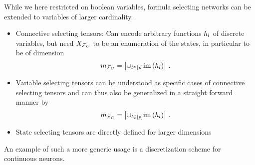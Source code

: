
While we here restricted on boolean variables, formula selecting networks can be extended to variables of larger cardinality.
\begin{itemize}
    \item Connective selecting tensors: Can encode arbitrary functions $h_{l}$ of discrete variables, but need $X_{\mathcal{F}_{C}}$ to be an enumeration of the states, in particular to be of dimension
    \[ m_{\mathcal{F}_{C}} = \left| \cup_{l\in[p]} \mathrm{im}\left(h_{l}\right) \right| \, . \]
    \item Variable selecting tensors can be understood as specific cases of connective selecting tensors and can thus also be generalized in a straight forward manner by
    \[ m_{\mathcal{F}_{C}} = \left| \cup_{l\in[p]} \mathrm{im}\left(h_{l}\right) \right| \, .  \]
    \item State selecting tensors are directly defined for larger dimensions
\end{itemize}


An example of such a more generic usage is a discretization scheme for continuous neurons.


